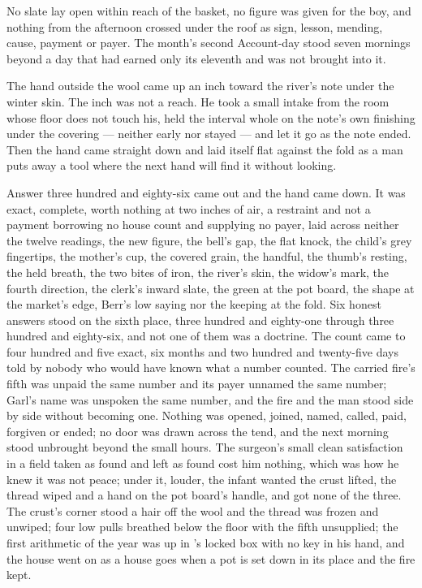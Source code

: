 No slate lay open within reach of the basket, no figure was given for the boy, and nothing from the afternoon crossed under the roof as sign, lesson, mending, cause, payment or payer. The month's second Account-day stood seven mornings beyond a day that had earned only its eleventh and was not brought into it.

The hand outside the wool came up an inch toward the river's note under the winter skin. The inch was not a reach. He took a small intake from the room whose floor does not touch his, held the interval whole on the note's own finishing under the covering --- neither early nor stayed --- and let it go as the note ended. Then the hand came straight down and laid itself flat against the fold as a man puts away a tool where the next hand will find it without looking.

Answer three hundred and eighty-six came out and the hand came down. It was exact, complete, worth nothing at two inches of air, a restraint and not a payment borrowing no house count and supplying no payer, laid across neither the twelve readings, the new figure, the bell's gap, the flat knock, the child's grey fingertips, the mother's cup, the covered grain, the handful, the thumb's resting, the held breath, the two bites of iron, the river's skin, the widow's mark, the fourth direction, the clerk's inward slate, the green at the pot board, the shape at the market's edge, Berr's low saying nor the keeping at the fold. Six honest answers stood on the sixth place, three hundred and eighty-one through three hundred and eighty-six, and not one of them was a doctrine. The count came to four hundred and five exact, six months and two hundred and twenty-five days told by nobody who would have known what a number counted. The carried fire's fifth was unpaid the same number and its payer unnamed the same number; Garl's name was unspoken the same number, and the fire and the man stood side by side without becoming one. Nothing was opened, joined, named, called, paid, forgiven or ended; no door was drawn across the tend, and the next morning stood unbrought beyond the small hours. The surgeon's small clean satisfaction in a field taken as found and left as found cost him nothing, which was how he knew it was not peace; under it, louder, the infant wanted the crust lifted, the thread wiped and a hand on the pot board's handle, and got none of the three. The crust's corner stood a hair off the wool and the thread was frozen and unwiped; four low pulls breathed below the floor with the fifth unsupplied; the first arithmetic of the year was up  in 's locked box with no key in his hand, and the house went on as a house goes when a pot is set down in its place and the fire kept.

